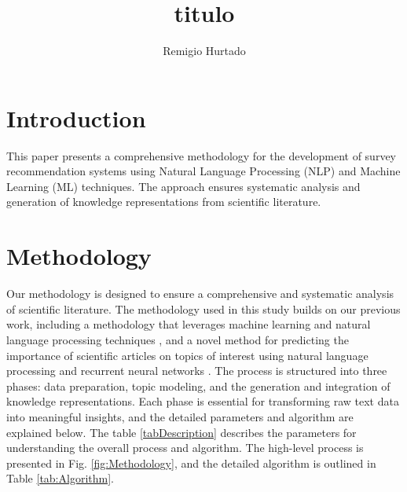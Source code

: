 \documentclass[runningheads]{llncs}
\begin{document}
%
\title{ titulo}
%
%
\author{Remigio Hurtado}
%
%
%
\maketitle    
%
\begin{abstract}

\end{abstract}

\begin{keywords}

\end{keywords}

\section{Introduction}
This paper presents a comprehensive methodology for the development of survey recommendation systems using Natural Language Processing (NLP) and Machine Learning (ML) techniques. The approach ensures systematic analysis and generation of knowledge representations from scientific literature.

\section{Methodology}

Our methodology is designed to ensure a comprehensive and systematic analysis of scientific literature. The methodology used in this study builds on our previous work, including a methodology that leverages machine learning and natural language processing techniques \cite{Hurtado2023}, and a novel method for predicting the importance of scientific articles on topics of interest using natural language processing and recurrent neural networks \cite{Lopez2024}. The process is structured into three phases: data preparation, topic modeling, and the generation and integration of knowledge representations. Each phase is essential for transforming raw text data into meaningful insights, and the detailed parameters and algorithm are explained below. The table \ref{tabDescription} describes the parameters for understanding the overall process and algorithm. The high-level process is presented in Fig. \ref{fig:Methodology}, and the detailed algorithm is outlined in Table \ref{tab:Algorithm}.\\ 
\end{document}
